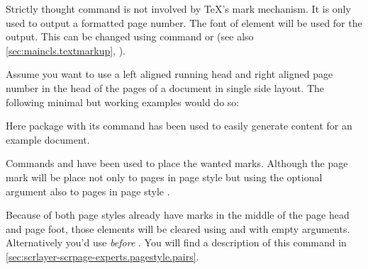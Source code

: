   Strictly thought command  is not involved by \TeX's mark
  mechanism. It is only used to output a formatted page number.
  The font of element
   will be used
  for the output. This can be changed using command  or
   (see also
  \autoref{sec:maincls.textmarkup}, ).%
    \begin{Example}
      Assume you want to use a left aligned running head and right aligned
      page number in the head of the pages of a document in single side
      layout. The following minimal but working examples would do so:
      Here package  with its
      command  has been used to
      easily generate content for an example document.

      Commands  and
       have been used to
      place the wanted marks. Although the page mark will be place not only to
      pages in page style  but using the optional
      argument also to pages in page style .

      Because of both page styles already have marks in the middle of the page
      head and page foot, those elements will be cleared using
       and
       with empty
      arguments. Alternatively you'd use
       \emph{before}
      . You will find a description of
      this command in \autoref{sec:scrlayer-scrpage-experts.pagestyle.pairs}.
    \end{Example}


